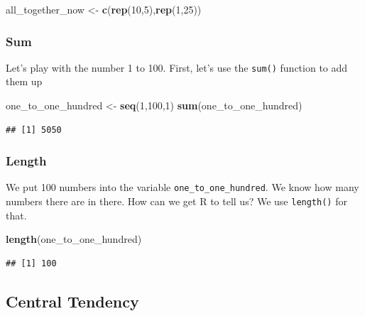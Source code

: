 \documentclass[]{book}
\newenvironment{Shaded}{\begin{snugshade}}{\end{snugshade}}
\newcommand{\KeywordTok}[1]{\textcolor[rgb]{0.13,0.29,0.53}{\textbf{{#1}}}}
\newcommand{\DecValTok}[1]{\textcolor[rgb]{0.00,0.00,0.81}{{#1}}}
\newcommand{\StringTok}[1]{\textcolor[rgb]{0.31,0.60,0.02}{{#1}}}
\newcommand{\NormalTok}[1]{{#1}}
\theoremstyle{definition}
\theoremstyle{definition}
\theoremstyle{definition}
\theoremstyle{remark}
\begin{document}
\begin{Shaded}
\begin{Highlighting}[]
\NormalTok{all_together_now <-}\StringTok{ }\KeywordTok{c}\NormalTok{(}\KeywordTok{rep}\NormalTok{(}\DecValTok{10}\NormalTok{,}\DecValTok{5}\NormalTok{),}\KeywordTok{rep}\NormalTok{(}\DecValTok{1}\NormalTok{,}\DecValTok{25}\NormalTok{)) }
\end{Highlighting}
\end{Shaded}

\subsubsection{Sum}\label{sum}

Let's play with the number 1 to 100. First, let's use the \texttt{sum()}
function to add them up

\begin{Shaded}
\begin{Highlighting}[]
\NormalTok{one_to_one_hundred <-}\StringTok{ }\KeywordTok{seq}\NormalTok{(}\DecValTok{1}\NormalTok{,}\DecValTok{100}\NormalTok{,}\DecValTok{1}\NormalTok{)}
\KeywordTok{sum}\NormalTok{(one_to_one_hundred)}
\end{Highlighting}
\end{Shaded}

\begin{verbatim}
## [1] 5050
\end{verbatim}

\subsubsection{Length}\label{length}

We put 100 numbers into the variable \texttt{one\_to\_one\_hundred}. We
know how many numbers there are in there. How can we get R to tell us?
We use \texttt{length()} for that.

\begin{Shaded}
\begin{Highlighting}[]
\KeywordTok{length}\NormalTok{(one_to_one_hundred)}
\end{Highlighting}
\end{Shaded}

\begin{verbatim}
## [1] 100
\end{verbatim}

\subsection{Central Tendency}\label{central-tendency}
\end{document}
